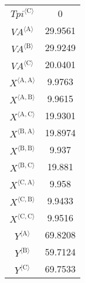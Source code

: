\begin{tabular}{c|c|}
${{T\!p\!i}}^{\langle \mathrm{C}\rangle}$ & 0 \\
${{V\!A}}^{\langle \mathrm{A}\rangle}$ & 29.9561 \\
${{V\!A}}^{\langle \mathrm{B}\rangle}$ & 29.9249 \\
${{V\!A}}^{\langle \mathrm{C}\rangle}$ & 20.0401 \\
${X}^{\langle \mathrm{A},\mathrm{A}\rangle}$ & 9.9763 \\
${X}^{\langle \mathrm{A},\mathrm{B}\rangle}$ & 9.9615 \\
${X}^{\langle \mathrm{A},\mathrm{C}\rangle}$ & 19.9301 \\
${X}^{\langle \mathrm{B},\mathrm{A}\rangle}$ & 19.8974 \\
${X}^{\langle \mathrm{B},\mathrm{B}\rangle}$ & 9.937 \\
${X}^{\langle \mathrm{B},\mathrm{C}\rangle}$ & 19.881 \\
${X}^{\langle \mathrm{C},\mathrm{A}\rangle}$ & 9.958 \\
${X}^{\langle \mathrm{C},\mathrm{B}\rangle}$ & 9.9433 \\
${X}^{\langle \mathrm{C},\mathrm{C}\rangle}$ & 9.9516 \\
${Y}^{\langle \mathrm{A}\rangle}$ & 69.8208 \\
${Y}^{\langle \mathrm{B}\rangle}$ & 59.7124 \\
${Y}^{\langle \mathrm{C}\rangle}$ & 69.7533 \\
\hline
\end{tabular}


